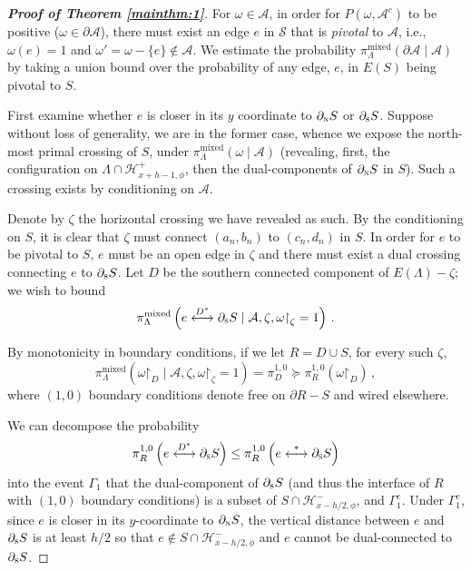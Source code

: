 \documentclass[reqno,11pt]{amsart}
\numberwithin{equation}{section}
\renewcommand{\restriction}{\mathord{\upharpoonright}}
\theoremstyle{definition}{
\newtheorem{example}[theorem]{Example}
\newtheorem{definition}[theorem]{Definition}
\newtheorem*{definition*}{Definition}
\newtheorem{problem}[theorem]{Problem}
\newtheorem{question}[theorem]{Question}
\newtheorem{remark}[theorem]{Remark}
}
\newcommand{\cH}{\ensuremath{\mathcal H}}
\newcommand{\north}{{\textsc{n}}}
\newcommand{\south}{{\textsc{s}}}
\newcommand{\alt}{{\mathrm{mixed}}}
\begin{document}
\begin{proof}[\emph{\textbf{Proof of Theorem \ref{mainthm:1}}}]
For $\omega\in \mathcal A$, in order for $P(\omega,\mathcal A^c)$ to be positive ($\omega\in\partial \mathcal A$), there must exist an edge $e$ in $\mathcal S$ that is \emph{pivotal} to $\mathcal A$, i.e., $\omega(e)=1$ and $\omega'=\omega-\{e\}\notin \mathcal A$. We estimate the probability $\pi^{\alt}_\Lambda(\partial \mathcal A\mid \mathcal A)$ by taking a union bound over the probability of any edge, $e$, in $E(S)$ being pivotal to $S$.

First examine whether $e$ is closer in its $y$ coordinate to $\partial_\north S$ or $\partial_\south S$. Suppose without loss of generality, we are in the former case, whence we expose the north-most primal crossing of $S$, under $\pi_\Lambda^{\alt}(\omega \mid \mathcal A)$ (revealing, first, the configuration on $\Lambda\cap \mathcal H^+_{x+h-1,\phi}$, then the dual-components of $\partial_\north S$ in $S$). Such a crossing exists by conditioning on $\mathcal A$.

Denote by $\zeta$ the  horizontal crossing we have revealed as such. By the conditioning on $S$, it is clear that $\zeta$ must connect $(a_n,b_n)$ to $(c_n,d_n)$ in $S$. In order for $e$ to be pivotal to $S$, $e$ must be an open edge in $\zeta$ and there must exist a dual crossing connecting $e$ to $\partial _\south S$. Let $D$ be the southern connected component of $E(\Lambda)-\zeta$; we wish to bound
\[\pi_{\Lambda}^{\alt}\left(e\stackrel{D^\ast}\longleftrightarrow \partial_\south S \mid \mathcal A, \zeta,\omega\restriction_{\zeta}=1\right)\,.
\]

By monotonicity in boundary conditions, if we let $R= D\cup S$, for every such $\zeta$, 
\[\pi_{\Lambda}^{\alt}(\omega\restriction_{D}\mid \mathcal A,\zeta,\omega\restriction_{\zeta}=1) = \pi_{D}^{1,0}\succeq \pi_R^{1,0}(\omega\restriction_{D})\,,
\]
where $(1,0)$ boundary conditions denote free on $ \partial R - S$ and wired elsewhere.

We can decompose the probability
\[\pi_R^{1,0}\left(e\stackrel{D^\ast}\longleftrightarrow \partial_{\south} S\right)\leq \pi_R^{1,0}\left(e\stackrel{\ast}\longleftrightarrow \partial_{\south} S \right)
\]
into the event $\Gamma_1$ that the dual-component of $\partial_\south S$ (and thus the interface of $R$ with $(1,0)$ boundary conditions) is a subset of $S \cap \mathcal H^-_{x-h/2,\phi}$, and $\Gamma_1^c$. Under $\Gamma_1^c$, since $e$ is closer in its $y$-coordinate to $\partial_\north S$, the vertical distance between $e$ and $\partial_\south S$ is at least $h/2$ so that $e\notin S\cap \cH^-_{x-h/2,\phi}$ and $e$ cannot be dual-connected to $\partial_\south S$.


\end{proof}
\end{document}
